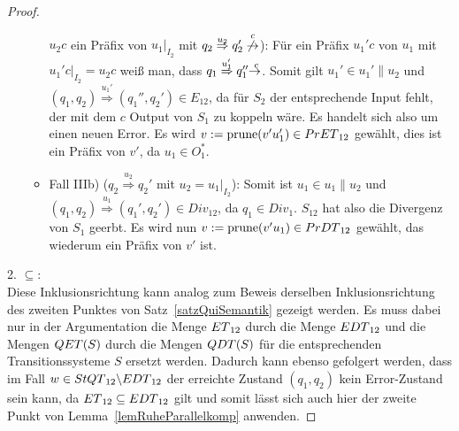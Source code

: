 \begin{proof}
\begin{itemize}
\begin{itemize}
          $u_2c$ ein Präfix von $u_1|_{I_2}$ mit $q_2
          \overset{u_2}{\Rightarrow}
          q_2'\overset{c}{\not{\hspace{-0.1cm}\rightarrow}}$\Big): Für ein Präfix
          $u_1'c$ von $u_1$ mit $u_1'c|_{I_2}= u_2c$ weiß man, dass $q_1
          \overset{u_1'}{\Rightarrow} q_1''
          \overset{c}{\hspace{-0.1cm}\rightarrow}$. Somit gilt $u_1'\in
          u_1'\|u_2$ und $(q_1,q_2) \overset{u_1'}{\Rightarrow} (q_1'',q_2')
          \in E_{12}$, da für $S_2$ der entsprechende Input fehlt, der mit dem
          $c$ Output von $S_1$ zu koppeln wäre. Es handelt sich also um einen
          neuen Error. Es wird $v:=\mathrm{prune}{}(v'u_1')\in PrET{}_{12}$ gewählt,
          dies ist ein Präfix von $v'$, da $u_1\in O_1^*$.
        \item Fall IIIb) \big($q_2 \overset{u_2}{\Rightarrow} q_2'$ mit $u_2=
          u_1|_{I_2}$\big): Somit ist $u_1\in u_1\|u_2$ und $(q_1,q_2)
          \overset{u_1}{\Rightarrow} (q_1',q_2') \in Div_{12}$, da $q_1\in
          Div_1$. $S_{12}$ hat also die Divergenz von $S_1$ geerbt. Es wird nun
          $v:= \mathrm{prune}{}(v'u_1)\in PrDT{}_{12}$ gewählt, das wiederum ein
          Präfix von $v'$ ist.
      \end{itemize}
  \end{itemize}

  2. \glqq{}$\subseteq$\grqq{}:\\
  Diese Inklusionsrichtung kann analog zum Beweis derselben Inklusionsrichtung
  des zweiten Punktes von Satz~\ref{satzQuiSemantik} gezeigt werden. Es muss dabei nur in der
  Argumentation die Menge $ET{}_{12}$ durch die Menge $EDT{}_{12}$ und die
  Mengen $QET{}(S)$ durch die Mengen $QDT{}(S)$ für die entsprechenden
  Transitionssysteme $S$ ersetzt
  werden. Dadurch kann ebenso gefolgert werden, dass im Fall $w\in
  StQT{}_{12}\backslash EDT{}_{12}$ der erreichte Zustand $(q_1,q_2)$ kein
  Error-Zustand sein kann, da $ET{}_{12}\subseteq EDT{}_{12}$ gilt und somit
  lässt sich auch hier der zweite Punkt von Lemma~\ref{lemRuheParallelkomp} anwenden.


\end{proof}
